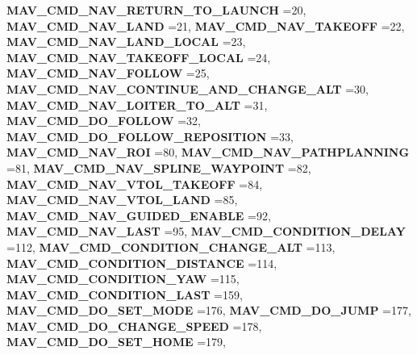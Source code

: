 \begin{DoxyCompactItemize}
\textbf{ M\+A\+V\+\_\+\+C\+M\+D\+\_\+\+N\+A\+V\+\_\+\+R\+E\+T\+U\+R\+N\+\_\+\+T\+O\+\_\+\+L\+A\+U\+N\+CH} =20, 
\textbf{ M\+A\+V\+\_\+\+C\+M\+D\+\_\+\+N\+A\+V\+\_\+\+L\+A\+ND} =21, 
\textbf{ M\+A\+V\+\_\+\+C\+M\+D\+\_\+\+N\+A\+V\+\_\+\+T\+A\+K\+E\+O\+FF} =22, 
\newline
\textbf{ M\+A\+V\+\_\+\+C\+M\+D\+\_\+\+N\+A\+V\+\_\+\+L\+A\+N\+D\+\_\+\+L\+O\+C\+AL} =23, 
\textbf{ M\+A\+V\+\_\+\+C\+M\+D\+\_\+\+N\+A\+V\+\_\+\+T\+A\+K\+E\+O\+F\+F\+\_\+\+L\+O\+C\+AL} =24, 
\textbf{ M\+A\+V\+\_\+\+C\+M\+D\+\_\+\+N\+A\+V\+\_\+\+F\+O\+L\+L\+OW} =25, 
\textbf{ M\+A\+V\+\_\+\+C\+M\+D\+\_\+\+N\+A\+V\+\_\+\+C\+O\+N\+T\+I\+N\+U\+E\+\_\+\+A\+N\+D\+\_\+\+C\+H\+A\+N\+G\+E\+\_\+\+A\+LT} =30, 
\newline
\textbf{ M\+A\+V\+\_\+\+C\+M\+D\+\_\+\+N\+A\+V\+\_\+\+L\+O\+I\+T\+E\+R\+\_\+\+T\+O\+\_\+\+A\+LT} =31, 
\textbf{ M\+A\+V\+\_\+\+C\+M\+D\+\_\+\+D\+O\+\_\+\+F\+O\+L\+L\+OW} =32, 
\textbf{ M\+A\+V\+\_\+\+C\+M\+D\+\_\+\+D\+O\+\_\+\+F\+O\+L\+L\+O\+W\+\_\+\+R\+E\+P\+O\+S\+I\+T\+I\+ON} =33, 
\textbf{ M\+A\+V\+\_\+\+C\+M\+D\+\_\+\+N\+A\+V\+\_\+\+R\+OI} =80, 
\newline
\textbf{ M\+A\+V\+\_\+\+C\+M\+D\+\_\+\+N\+A\+V\+\_\+\+P\+A\+T\+H\+P\+L\+A\+N\+N\+I\+NG} =81, 
\textbf{ M\+A\+V\+\_\+\+C\+M\+D\+\_\+\+N\+A\+V\+\_\+\+S\+P\+L\+I\+N\+E\+\_\+\+W\+A\+Y\+P\+O\+I\+NT} =82, 
\textbf{ M\+A\+V\+\_\+\+C\+M\+D\+\_\+\+N\+A\+V\+\_\+\+V\+T\+O\+L\+\_\+\+T\+A\+K\+E\+O\+FF} =84, 
\textbf{ M\+A\+V\+\_\+\+C\+M\+D\+\_\+\+N\+A\+V\+\_\+\+V\+T\+O\+L\+\_\+\+L\+A\+ND} =85, 
\newline
\textbf{ M\+A\+V\+\_\+\+C\+M\+D\+\_\+\+N\+A\+V\+\_\+\+G\+U\+I\+D\+E\+D\+\_\+\+E\+N\+A\+B\+LE} =92, 
\textbf{ M\+A\+V\+\_\+\+C\+M\+D\+\_\+\+N\+A\+V\+\_\+\+L\+A\+ST} =95, 
\textbf{ M\+A\+V\+\_\+\+C\+M\+D\+\_\+\+C\+O\+N\+D\+I\+T\+I\+O\+N\+\_\+\+D\+E\+L\+AY} =112, 
\textbf{ M\+A\+V\+\_\+\+C\+M\+D\+\_\+\+C\+O\+N\+D\+I\+T\+I\+O\+N\+\_\+\+C\+H\+A\+N\+G\+E\+\_\+\+A\+LT} =113, 
\newline
\textbf{ M\+A\+V\+\_\+\+C\+M\+D\+\_\+\+C\+O\+N\+D\+I\+T\+I\+O\+N\+\_\+\+D\+I\+S\+T\+A\+N\+CE} =114, 
\textbf{ M\+A\+V\+\_\+\+C\+M\+D\+\_\+\+C\+O\+N\+D\+I\+T\+I\+O\+N\+\_\+\+Y\+AW} =115, 
\textbf{ M\+A\+V\+\_\+\+C\+M\+D\+\_\+\+C\+O\+N\+D\+I\+T\+I\+O\+N\+\_\+\+L\+A\+ST} =159, 
\textbf{ M\+A\+V\+\_\+\+C\+M\+D\+\_\+\+D\+O\+\_\+\+S\+E\+T\+\_\+\+M\+O\+DE} =176, 
\newline
\textbf{ M\+A\+V\+\_\+\+C\+M\+D\+\_\+\+D\+O\+\_\+\+J\+U\+MP} =177, 
\textbf{ M\+A\+V\+\_\+\+C\+M\+D\+\_\+\+D\+O\+\_\+\+C\+H\+A\+N\+G\+E\+\_\+\+S\+P\+E\+ED} =178, 
\textbf{ M\+A\+V\+\_\+\+C\+M\+D\+\_\+\+D\+O\+\_\+\+S\+E\+T\+\_\+\+H\+O\+ME} =179, 

\end{DoxyCompactItemize}
